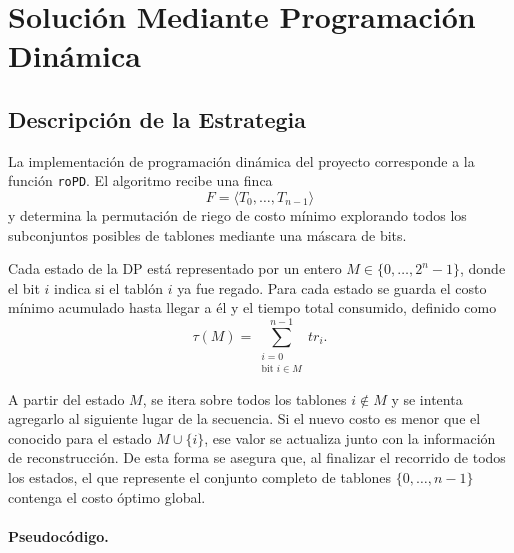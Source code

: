 \documentclass[12pt,a4paper]{article}
\begin{document}

\section{Soluci\'on Mediante Programaci\'on Din\'amica}

\subsection{Descripci\'on de la Estrategia}

La implementaci\'on de programaci\'on din\'amica del proyecto corresponde a la funci\'on \texttt{roPD}. El algoritmo recibe una finca
\[
F=\langle T_0,\dots,T_{n-1}\rangle
\]
y determina la permutaci\'on de riego de costo m\'inimo explorando todos los subconjuntos posibles de tablones mediante una m\'ascara de bits.

Cada estado de la DP est\'a representado por un entero \(M \in \{0,\dots,2^n-1\}\), donde el bit \(i\) indica si el tabl\'on \(i\) ya fue regado. Para cada estado se guarda el costo m\'inimo acumulado hasta llegar a \'el y el tiempo total consumido, definido como
\[
\tau(M) = \sum_{\substack{i=0 \\ \text{bit } i \in M}}^{n-1} tr_i.
\]

A partir del estado \(M\), se itera sobre todos los tablones \(i \notin M\) y se intenta agregarlo al siguiente lugar de la secuencia. Si el nuevo costo es menor que el conocido para el estado \(M \cup \{i\}\), ese valor se actualiza junto con la informaci\'on de reconstrucci\'on. De esta forma se asegura que, al finalizar el recorrido de todos los estados, el que represente el conjunto completo de tablones \(\{0,\dots,n-1\}\) contenga el costo \'optimo global.

\paragraph{Pseudoc\'odigo.}
\end{document}
